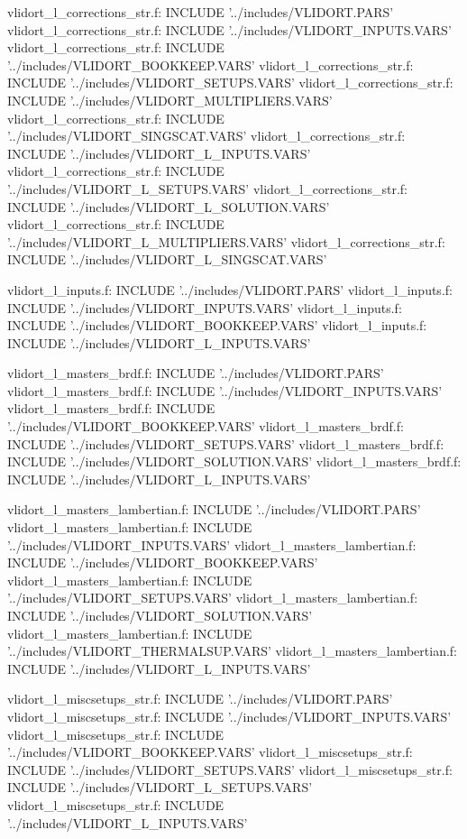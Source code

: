 vlidort_l_corrections_str.f:      INCLUDE '../includes/VLIDORT.PARS'
vlidort_l_corrections_str.f:      INCLUDE '../includes/VLIDORT_INPUTS.VARS'
vlidort_l_corrections_str.f:      INCLUDE '../includes/VLIDORT_BOOKKEEP.VARS'
vlidort_l_corrections_str.f:      INCLUDE '../includes/VLIDORT_SETUPS.VARS'
vlidort_l_corrections_str.f:      INCLUDE '../includes/VLIDORT_MULTIPLIERS.VARS'
vlidort_l_corrections_str.f:      INCLUDE '../includes/VLIDORT_SINGSCAT.VARS'
vlidort_l_corrections_str.f:      INCLUDE '../includes/VLIDORT_L_INPUTS.VARS'
vlidort_l_corrections_str.f:      INCLUDE '../includes/VLIDORT_L_SETUPS.VARS'
vlidort_l_corrections_str.f:      INCLUDE '../includes/VLIDORT_L_SOLUTION.VARS'
vlidort_l_corrections_str.f:      INCLUDE '../includes/VLIDORT_L_MULTIPLIERS.VARS'
vlidort_l_corrections_str.f:      INCLUDE '../includes/VLIDORT_L_SINGSCAT.VARS'

vlidort_l_inputs.f:      INCLUDE '../includes/VLIDORT.PARS'
vlidort_l_inputs.f:      INCLUDE '../includes/VLIDORT_INPUTS.VARS'
vlidort_l_inputs.f:      INCLUDE '../includes/VLIDORT_BOOKKEEP.VARS'
vlidort_l_inputs.f:      INCLUDE '../includes/VLIDORT_L_INPUTS.VARS'

vlidort_l_masters_brdf.f:      INCLUDE '../includes/VLIDORT.PARS'
vlidort_l_masters_brdf.f:      INCLUDE '../includes/VLIDORT_INPUTS.VARS'
vlidort_l_masters_brdf.f:      INCLUDE '../includes/VLIDORT_BOOKKEEP.VARS'
vlidort_l_masters_brdf.f:      INCLUDE '../includes/VLIDORT_SETUPS.VARS'
vlidort_l_masters_brdf.f:      INCLUDE '../includes/VLIDORT_SOLUTION.VARS'
vlidort_l_masters_brdf.f:      INCLUDE '../includes/VLIDORT_L_INPUTS.VARS'

vlidort_l_masters_lambertian.f:      INCLUDE '../includes/VLIDORT.PARS'
vlidort_l_masters_lambertian.f:      INCLUDE '../includes/VLIDORT_INPUTS.VARS'
vlidort_l_masters_lambertian.f:      INCLUDE '../includes/VLIDORT_BOOKKEEP.VARS'
vlidort_l_masters_lambertian.f:      INCLUDE '../includes/VLIDORT_SETUPS.VARS'
vlidort_l_masters_lambertian.f:      INCLUDE '../includes/VLIDORT_SOLUTION.VARS'
vlidort_l_masters_lambertian.f:      INCLUDE '../includes/VLIDORT_THERMALSUP.VARS'
vlidort_l_masters_lambertian.f:      INCLUDE '../includes/VLIDORT_L_INPUTS.VARS'

vlidort_l_miscsetups_str.f:      INCLUDE '../includes/VLIDORT.PARS'
vlidort_l_miscsetups_str.f:      INCLUDE '../includes/VLIDORT_INPUTS.VARS'
vlidort_l_miscsetups_str.f:      INCLUDE '../includes/VLIDORT_BOOKKEEP.VARS'
vlidort_l_miscsetups_str.f:      INCLUDE '../includes/VLIDORT_SETUPS.VARS'
vlidort_l_miscsetups_str.f:      INCLUDE '../includes/VLIDORT_L_SETUPS.VARS'
vlidort_l_miscsetups_str.f:      INCLUDE '../includes/VLIDORT_L_INPUTS.VARS'

